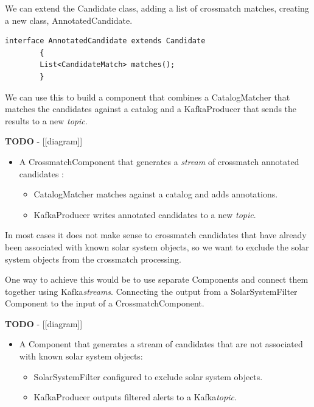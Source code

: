 \documentclass{article}
\newcommand{\kafka} {Kafka\xspace}
\newcommand{\kftopic} {\textit{topic}\xspace}
\newcommand{\kfstream} {\textit{stream}\xspace}
\newcommand{\kfstreams} {\textit{streams}\xspace}
\newcommand{\crossmatch} {crossmatch\xspace}
\newcommand{\catalog} {catalog\xspace}
\newcommand{\javaname}[1] {{\ttfamily\color{codeblue} #1}}
\newcommand{\javaplural}[1] {\javaname{#1}s}
\begin{document}
We can extend the \javaname{Candidate} class, adding a list of \crossmatch matches, creating a new class, \javaname{AnnotatedCandidate}.

\begin{lstlisting}[style=Java]
    interface AnnotatedCandidate extends Candidate
        {
        List<CandidateMatch> matches();
        }
\end{lstlisting}

We can use this to build a component that combines a \javaname{CatalogMatcher} that matches the candidates against a \catalog and a \javaname{KafkaProducer} that sends the results to a new \kftopic.

\textbf{TODO} - [[diagram]]

\begin{itemize}
    \item A \javaname{CrossmatchComponent} that generates a \kfstream of \crossmatch annotated candidates :
    \begin{itemize}
        \item \javaname{CatalogMatcher} matches against a \catalog and adds annotations.
    \end{itemize}
    \begin{itemize}
        \item \javaname{KafkaProducer} writes annotated candidates to a new \kftopic.
    \end{itemize}
\end{itemize}

In most cases it does not make sense to \crossmatch candidates that have already been associated with known solar system objects, so we want to exclude the solar system objects from the \crossmatch processing.

One way to achieve this would be to use separate \javaplural{Component} and connect them together using \kafka \kfstreams. Connecting the output from a \javaname{SolarSystemFilter} \javaname{Component} to the input of a \javaname{CrossmatchComponent}.

\textbf{TODO} - [[diagram]]

\begin{itemize}
    \item A \javaname{Component} that generates a stream of candidates that are not associated with known solar system objects:
    \begin{itemize}
        \item \javaname{SolarSystemFilter} configured to exclude solar system objects.
    \end{itemize}
    \begin{itemize}
        \item \javaname{KafkaProducer} outputs filtered alerts to a \kafka \kftopic.
    \end{itemize}
\end{itemize}
\end{document}

